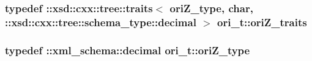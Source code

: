 \hypertarget{classori__t_ad45b223f4cb199de8834bb2fcbbcbe77}{
\subsubsection[{ori\-Z\-\_\-traits}]{\setlength{\rightskip}{0pt plus 5cm}typedef \-::xsd\-::cxx\-::tree\-::traits$<$ {\bf ori\-Z\-\_\-type}, char, \-::xsd\-::cxx\-::tree\-::schema\-\_\-type\-::decimal $>$ {\bf ori\-\_\-t\-::ori\-Z\-\_\-traits}}}\label{classori__t_ad45b223f4cb199de8834bb2fcbbcbe77}
\hypertarget{classori__t_ade8315fb919208a45ec58303232b842b}{
\subsubsection[{ori\-Z\-\_\-type}]{\setlength{\rightskip}{0pt plus 5cm}typedef \-::{\bf xml\-\_\-schema\-::decimal} {\bf ori\-\_\-t\-::ori\-Z\-\_\-type}}}\label{classori__t_ade8315fb919208a45ec58303232b842b}


